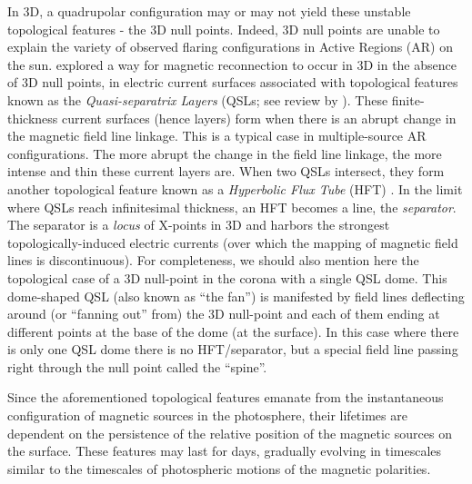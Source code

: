 \documentclass[preprint]{aastex}
\begin{document}
In 3D, a quadrupolar configuration may or may not yield these unstable topological features - the 3D null points. Indeed, 3D null points are unable to explain the variety of observed flaring configurations in Active Regions (AR) on the sun. \citet{Priest_Demoulin_1995} explored a way for magnetic reconnection to occur in 3D in the absence of 3D null points, in electric current surfaces associated with topological features known as the \emph{Quasi-separatrix Layers} (QSLs; see review by \citealt{Longcope_2005}). These finite-thickness current surfaces (hence layers) form when there is an abrupt change in the magnetic field line linkage. This is a typical case in multiple-source AR configurations. The more abrupt the change in the field line linkage, the more intense and thin these current layers are. When two QSLs intersect, they form another topological feature known as a \emph{Hyperbolic Flux Tube} (HFT) \citep{Titov_etal_2002, Titov_etal_2003}. In the limit where QSLs reach infinitesimal thickness, an HFT becomes a line, the \emph{separator}. The separator is a \emph{locus} of X-points in 3D and harbors the strongest topologically-induced electric currents (over which the mapping of magnetic field lines is discontinuous). For completeness, we should also mention here the topological case of a 3D null-point in the corona with a single QSL dome. This dome-shaped QSL (also known as ``the fan'') is manifested by field lines deflecting around (or ``fanning out'' from) the 3D null-point and each of them ending at different points at the base of the dome (at the surface). In this case where there is only one QSL dome there is no HFT/separator, but a special field line passing right through the null point called the ``spine''. 

Since the aforementioned topological features emanate from the instantaneous configuration of magnetic sources in the photosphere, their lifetimes are dependent on the persistence of the relative position of the magnetic sources on the surface. These features may last for days, gradually evolving in timescales similar to the timescales of photospheric motions of the magnetic polarities. 
\end{document}
